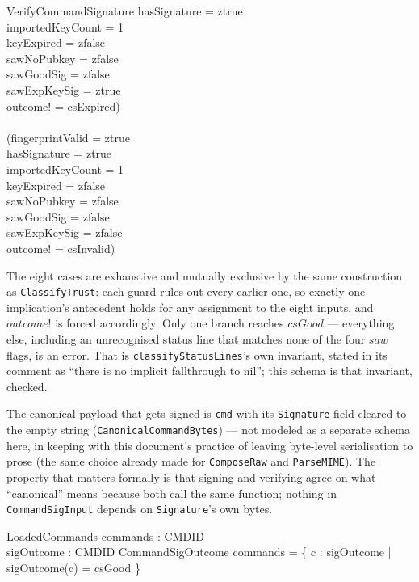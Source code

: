 \documentclass[a4paper,10pt,fleqn]{article}
\begin{document}
\begin{schema}{VerifyCommandSignature}
  \quad \land hasSignature = ztrue \\
  \quad \land importedKeyCount = 1 \\
  \quad \land keyExpired = zfalse \\
  \quad \land sawNoPubkey = zfalse \\
  \quad \land sawGoodSig = zfalse \\
  \quad \land sawExpKeySig = ztrue \\
  \quad \implies outcome! = csExpired) \\
  \land \\
  (fingerprintValid = ztrue \\
  \quad \land hasSignature = ztrue \\
  \quad \land importedKeyCount = 1 \\
  \quad \land keyExpired = zfalse \\
  \quad \land sawNoPubkey = zfalse \\
  \quad \land sawGoodSig = zfalse \\
  \quad \land sawExpKeySig = zfalse \\
  \quad \implies outcome! = csInvalid)
\end{schema}

The eight cases are exhaustive and mutually exclusive by the same
construction as \texttt{ClassifyTrust}: each guard rules out every
earlier one, so exactly one implication's antecedent holds for any
assignment to the eight inputs, and $outcome!$ is forced accordingly.
Only one branch reaches $csGood$ --- everything else, including an
unrecognised status line that matches none of the four $saw$ flags,
is an error.  That is \texttt{classifyStatusLines}'s own invariant,
stated in its comment as ``there is no implicit fallthrough to
nil''; this schema is that invariant, checked.

The canonical payload that gets signed is \texttt{cmd} with its
\texttt{Signature} field cleared to the empty string
(\texttt{CanonicalCommandBytes}) --- not modeled as a separate
schema here, in keeping with this document's practice of leaving
byte-level serialisation to prose (the same choice already made for
\texttt{ComposeRaw} and \texttt{ParseMIME}).  The property that
matters formally is that signing and verifying agree on what
``canonical'' means because both call the same function; nothing in
\texttt{CommandSigInput} depends on \texttt{Signature}'s own bytes.

\begin{schema}{LoadedCommands}
  commands : \power CMDID \\
  sigOutcome : CMDID \pfun CommandSigOutcome
  \where
  commands = \{ c : \dom sigOutcome | sigOutcome(c) = csGood \}
\end{schema}
\end{document}
